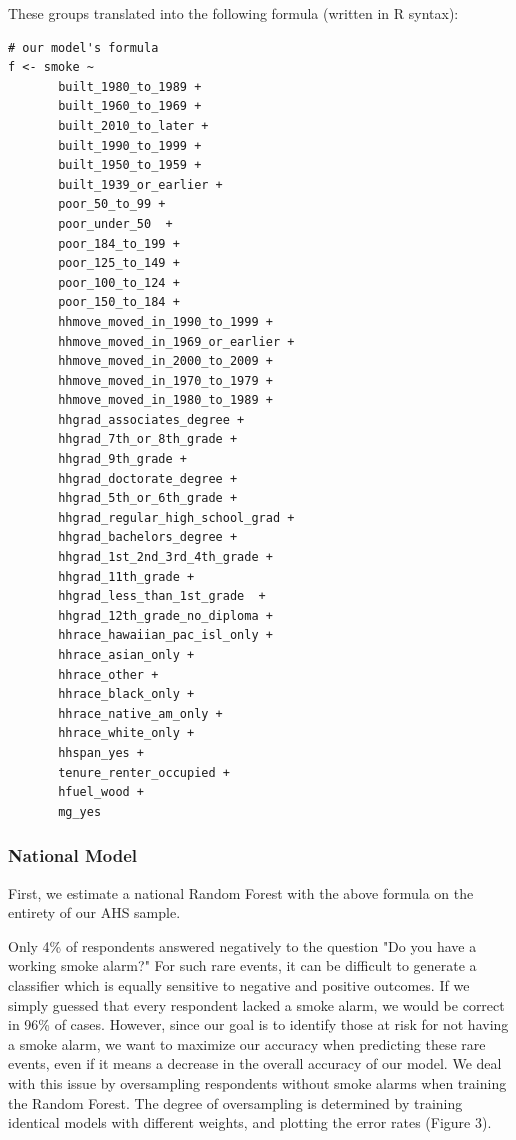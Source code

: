 \documentclass{sig-alternate}
\begin{document}
These groups translated into the following formula (written in R syntax):

\begin{verbatim}
# our model's formula
f <- smoke ~  
       built_1980_to_1989 +
       built_1960_to_1969 +
       built_2010_to_later +
       built_1990_to_1999 +
       built_1950_to_1959 +
       built_1939_or_earlier +
       poor_50_to_99 +
       poor_under_50  +
       poor_184_to_199 +
       poor_125_to_149 +
       poor_100_to_124 +
       poor_150_to_184 +
       hhmove_moved_in_1990_to_1999 +
       hhmove_moved_in_1969_or_earlier +
       hhmove_moved_in_2000_to_2009 +
       hhmove_moved_in_1970_to_1979 +
       hhmove_moved_in_1980_to_1989 +
       hhgrad_associates_degree +
       hhgrad_7th_or_8th_grade +
       hhgrad_9th_grade +
       hhgrad_doctorate_degree +
       hhgrad_5th_or_6th_grade +
       hhgrad_regular_high_school_grad +
       hhgrad_bachelors_degree +
       hhgrad_1st_2nd_3rd_4th_grade +
       hhgrad_11th_grade +
       hhgrad_less_than_1st_grade  +
       hhgrad_12th_grade_no_diploma +
       hhrace_hawaiian_pac_isl_only +
       hhrace_asian_only +
       hhrace_other +
       hhrace_black_only +
       hhrace_native_am_only +
       hhrace_white_only +
       hhspan_yes +
       tenure_renter_occupied +
       hfuel_wood +
       mg_yes
\end{verbatim}

\subsubsection{National Model}

First, we estimate a national Random Forest with the above formula on the entirety of our AHS sample.

Only 4\% of respondents answered negatively to the question "Do you have a working smoke alarm?" For such rare events, it can be difficult to generate a classifier which is equally sensitive to negative and positive outcomes. If we simply guessed that every respondent lacked a smoke alarm, we would be correct in 96\% of cases. However, since our goal is to identify those at risk for not having a smoke alarm, we want to maximize our accuracy when predicting these rare events, even if it means a decrease in the overall accuracy of our model.  We deal with this issue by oversampling respondents without smoke alarms when training the Random Forest. The degree of oversampling is determined by training identical models with different weights, and plotting the error rates (Figure 3). 
\end{document}
